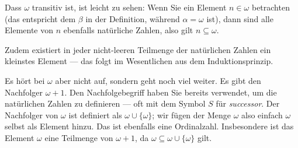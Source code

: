 \begin{spoken-clean}[00:47:38 - 00:49:58]
Dass $\omega$ transitiv ist, ist leicht zu sehen: Wenn Sie ein Element $n \in \omega$ betrachten (das entspricht dem $\beta$ in der Definition, während $\alpha = \omega$ ist), dann sind alle Elemente von $n$ ebenfalls natürliche Zahlen, also gilt $n \subseteq \omega$.

Zudem existiert in jeder nicht-leeren Teilmenge der natürlichen Zahlen ein kleinstes Element --- das folgt im Wesentlichen aus dem Induktionsprinzip.

Es hört bei $\omega$ aber nicht auf, sondern geht noch viel weiter. Es gibt den Nachfolger $\omega + 1$. Den Nachfolgebegriff haben Sie bereits verwendet, um die natürlichen Zahlen zu definieren --- oft mit dem Symbol $S$ für \emph{successor}. Der Nachfolger von $\omega$ ist definiert als $\omega \cup \{\omega\}$; wir fügen der Menge $\omega$ also einfach $\omega$ selbst als Element hinzu. Das ist ebenfalls eine Ordinalzahl. Insbesondere ist das Element $\omega$ eine Teilmenge von $\omega + 1$, da $\omega \subseteq \omega \cup \{\omega\}$ gilt.
\end{spoken-clean}

\begin{math-stroke}
\end{math-stroke}

